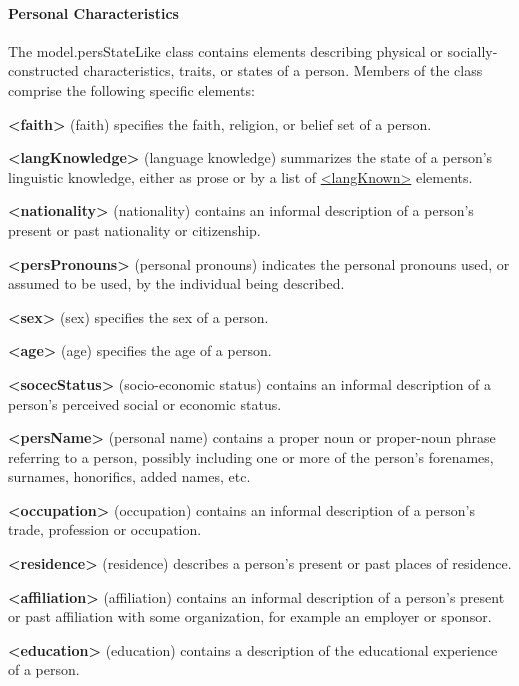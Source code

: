 \paragraph[{Personal Characteristics}]{Personal Characteristics}\label{NDPERSEpc}\par
The \textsf{model.persStateLike} class contains elements describing physical or socially-constructed characteristics, traits, or states of a person. Members of the class comprise the following specific elements:  
\begin{sansreflist}
  
\item [\textbf{<faith>}] (faith) specifies the faith, religion, or belief set of a person.
\item [\textbf{<langKnowledge>}] (language knowledge) summarizes the state of a person's linguistic knowledge, either as prose or by a list of \hyperref[TEI.langKnown]{<langKnown>} elements.
\item [\textbf{<nationality>}] (nationality) contains an informal description of a person's present or past nationality or citizenship.
\item [\textbf{<persPronouns>}] (personal pronouns) indicates the personal pronouns used, or assumed to be used, by the individual being described.
\item [\textbf{<sex>}] (sex) specifies the sex of a person.
\item [\textbf{<age>}] (age) specifies the age of a person.
\item [\textbf{<socecStatus>}] (socio-economic status) contains an informal description of a person's perceived social or economic status.
\item [\textbf{<persName>}] (personal name) contains a proper noun or proper-noun phrase referring to a person, possibly including one or more of the person's forenames, surnames, honorifics, added names, etc.
\item [\textbf{<occupation>}] (occupation) contains an informal description of a person's trade, profession or occupation.
\item [\textbf{<residence>}] (residence) describes a person's present or past places of residence.
\item [\textbf{<affiliation>}] (affiliation) contains an informal description of a person's present or past affiliation with some organization, for example an employer or sponsor.
\item [\textbf{<education>}] (education) contains a description of the educational experience of a person.

\end{sansreflist}
